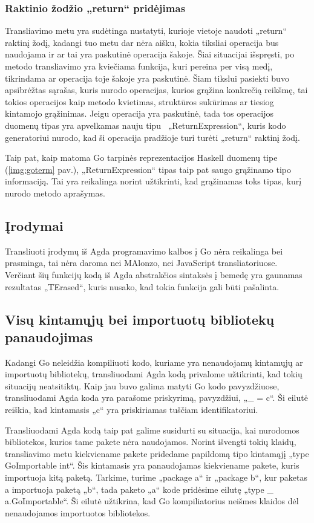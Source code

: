 \documentclass{VUMIFPSkursinis}
\begin{document}
\subsubsection{Raktinio žodžio „return“ pridėjimas}
Transliavimo metu yra sudėtinga nustatyti, kurioje vietoje naudoti „return“ raktinį žodį, kadangi tuo metu dar nėra aišku, kokia tiksliai operacija bus naudojama ir ar tai yra paskutinė operacija šakoje. Šiai situacijai išspręsti, po metodo transliavimo yra kviečiama funkcija, kuri pereina per visą medį, tikrindama ar operacija toje šakoje yra paskutinė. Šiam tikslui pasiekti buvo apsibrėžtas sąrašas, kuris nurodo operacijas, kurios grąžina konkrečią reikšmę, tai tokios operacijos kaip metodo kvietimas, struktūros sukūrimas ar tiesiog kintamojo grąžinimas. Jeigu operacija yra paskutinė, tada tos operacijos duomenų tipas yra apvelkamas nauju tipu \mbox{ „ReturnExpression“}, kuris kodo generatoriui nurodo, kad ši operacija pradžioje turi turėti „return“ raktinį žodį. \par Taip pat, kaip matoma Go tarpinės reprezentacijos Haskell duomenų tipe (\ref{img:goterm} pav.), „ReturnExpression“ tipas taip pat saugo grąžinamo tipo informaciją. Tai yra reikalinga norint užtikrinti, kad grąžinamas toks tipas, kurį nurodo metodo aprašymas.
\subsection{Įrodymai}
Transliuoti įrodymų iš Agda programavimo kalbos į Go nėra reikalinga bei prasminga, tai nėra daroma nei MAlonzo, nei JavaScript transliatoriuose. Verčiant šių funkcijų kodą iš Agda abstrakčios sintaksės į bemedę yra gaunamas rezultatas „TErased“, kuris nusako, kad tokia funkcija gali būti pašalinta.
\subsection{Visų kintamųjų bei importuotų bibliotekų panaudojimas}
Kadangi Go neleidžia kompiliuoti kodo, kuriame yra nenaudojamų kintamųjų ar importuotų bibliotekų, transliuodami Agda kodą privalome užtikrinti, kad tokių situacijų neatsitiktų. Kaip jau buvo galima matyti Go kodo pavyzdžiuose, transliuodami Agda koda yra parašome priskyrimą, pavyzdžiui, „\_ = c“. Ši eilutė reiškia, kad kintamasis „c“ yra priskiriamas tuščiam identifikatoriui.\par Transliuodami Agda kodą taip pat galime susidurti su situacija, kai nurodomos bibliotekos, kurios tame pakete nėra naudojamos. Norint išvengti tokių klaidų, transliavimo metu kiekviename pakete pridedame papildomą tipo kintamąjį „type GoImportable int“. Šis kintamasis yra panaudojamas kiekviename pakete, kuris importuoja kitą paketą. Tarkime, turime „package a“ ir „package b“, kur paketas a importuoja paketą „b“, tada paketo „a“ kode pridėsime eilutę „type \_ a.GoImportable“. Ši eilutė užtikrina, kad Go kompiliatorius neišmes klaidos dėl nenaudojamos importuotos bibliotekos.
\end{document}
